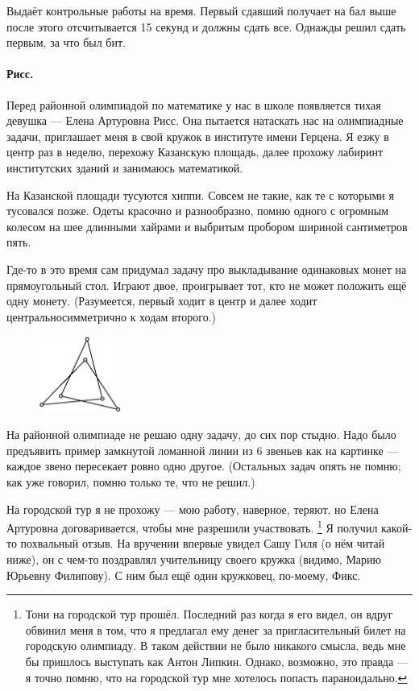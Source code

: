 \documentclass{book}
\begin{document}
Выдаёт контрольные работы на время.
Первый сдавший получает на бал выше после этого отсчитывается 15 секунд и должны сдать все.
Однажды решил сдать первым, за что был бит.


\paragraph{Рисс.}
Перед районной олимпиадой по математике у нас в школе появляется тихая девушка --- Елена Артуровна Рисс.
Она пытается натаскать нас на олимпиадные задачи, 
приглашает меня в свой кружок 
в институте имени Герцена.
Я езжу в центр раз в неделю, перехожу Казанскую площадь, далее прохожу лабиринт институтских зданий и занимаюсь математикой.

На Казанской площади тусуются хиппи.
Совсем не такие, как те с которыми я тусовался позже.
Одеты красочно и разнообразно, помню одного с огромным колесом на шее длинными хайрами и выбритым пробором шириной сантиметров пять.

Где-то в это время сам придумал задачу про выкладывание одинаковых монет на прямоугольный стол.
Играют двое, проигрывает тот, кто не может положить ещё одну монету.
(Разумеется, первый ходит в центр и далее ходит центральносимметрично к ходам второго.)

\begin{figure}
\vskip-4mm
\centering
\includegraphics[width=27mm,angle=0]{pics/lomannaya}
\vskip-4mm
\end{figure}

На районной олимпиаде не решаю одну задачу, 
до сих пор стыдно.
Надо было предъявить пример замкнутой ломанной линии из 6 звеньев как на картинке ---
каждое звено пересекает ровно одно другое.
(Остальных задач опять не помню; как уже говорил, помню только те, что не решил.)

На городской тур я не прохожу
--- мою работу, наверное, теряют,
но Елена Артуровна договаривается, чтобы мне разрешили участвовать.%
\footnote{Тони на городской тур прошёл.
Последний раз когда я его видел,
он вдруг обвинил меня в том, 
что я предлагал ему денег за пригласительный билет на городскую олимпиаду.
В таком действии не было никакого смысла, ведь мне бы пришлось выступать как Антон Липкин.
Однако, возможно, это правда --- я точно помню, что на городской тур мне хотелось попасть параноидально.}
Я получил какой-то похвальный отзыв.
На вручении впервые увидел Сашу Гиля (о нём читай ниже), он с чем-то поздравлял учительницу своего кружка (видимо, Марию Юрьевну Филипову).
С ним был ещё один кружковец, по-моему, Фикс.
\end{document}
